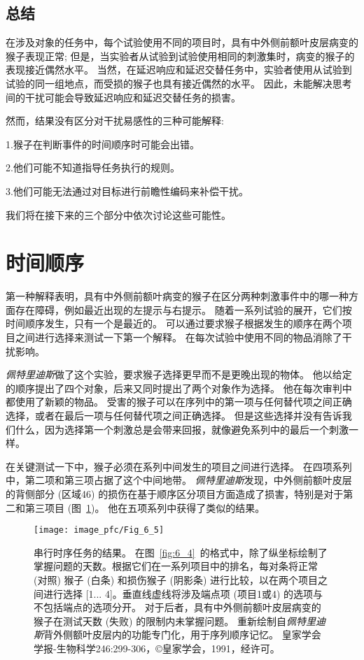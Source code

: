 \subsection{总结}

在涉及对象的任务中，每个试验使用不同的项目时，具有中外侧前额叶皮层病变的猴子表现正常; 
但是，当实验者从试验到试验使用相同的刺激集时，病变的猴子的表现接近偶然水平。
当然，在延迟响应和延迟交替任务中，实验者使用从试验到试验的同一组地点，而受损的猴子也具有接近偶然的水平。
因此，未能解决思考间的干扰可能会导致延迟响应和延迟交替任务的损害。


然而，结果没有区分对干扰易感性的三种可能解释:
\par


1.猴子在判断事件的时间顺序时可能会出错。
\par

2.他们可能不知道指导任务执行的规则。
\par

3.他们可能无法通过对目标进行前瞻性编码来补偿干扰。

我们将在接下来的三个部分中依次讨论这些可能性。



\section{时间顺序}

第一种解释表明，具有中外侧前额叶病变的猴子在区分两种刺激事件中的哪一种方面存在障碍，例如最近出现的左提示与右提示。
随着一系列试验的展开，它们按时间顺序发生，只有一个是最近的。
可以通过要求猴子根据发生的顺序在两个项目之间进行选择来测试一下第一个解释。
在每次试验中使用不同的物品消除了干扰影响。


\textit{佩特里迪斯}\cite{petrides1991functional}做了这个实验，要求猴子选择更早而不是更晚出现的物体。
他以给定的顺序提出了四个对象，后来又同时提出了两个对象作为选择。
他在每次审判中都使用了新颖的物品。
受害的猴子可以在序列中的第一项与任何替代项之间正确选择，或者在最后一项与任何替代项之间正确选择。
但是这些选择并没有告诉我们什么，因为选择第一个刺激总是会带来回报，就像避免系列中的最后一个刺激一样。


在关键测试一下中，猴子必须在系列中间发生的项目之间进行选择。
在四项系列中，第二项和第三项占据了这个中间地带。
\textit{佩特里迪斯}发现，中外侧前额叶皮层的背侧部分 (区域46) 的损伤在基于顺序区分项目方面造成了损害，特别是对于第二和第三项目 (图~\ref{fig:6_5})。
他在五项系列中获得了类似的结果。


\begin{figure}
	\centering
	\texttt{[image: image\_pfc/Fig\_6\_5]}
	\caption{串行时序任务的结果。
		在图~\ref{fig:6_4}~的格式中，除了纵坐标绘制了掌握问题的天数。根据它们在一系列项目中的排名，每对条将正常 (对照) 猴子 (白条) 和损伤猴子 (阴影条) 进行比较，以在两个项目之间进行选择 [1... 4]。垂直线虚线将涉及端点项 (项目1或4) 的选项与不包括端点的选项分开。
		对于后者，具有中外侧前额叶皮层病变的猴子在测试天数 (失败) 的限制内未掌握问题。
		重新绘制自\textit{佩特里迪斯}背外侧额叶皮层内的功能专门化，用于序列顺序记忆。
		皇家学会学报-生物科学246:299-306，©皇家学会，1991，经许可。}
	\label{fig:6_5}
\end{figure}


